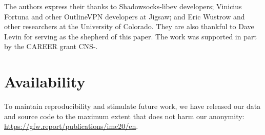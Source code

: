 \documentclass[sigconf,letterpaper]{acmart}
\begin{document}
\begin{acks}
The authors express their thanks to
Shadowsocks-libev developers;
Vinicius Fortuna and other OutlineVPN developers at Jigsaw;
and Eric Wustrow and other researchers at the University of Colorado.
They are also thankful to Dave Levin for serving as the shepherd of this paper.
The work was supported in part by the
 CAREER grant
CNS-.
\end{acks}

\section*{Availability}
To maintain reproducibility and stimulate future work,
we have released our data and source code
to the maximum extent that does not harm our anonymity:
\url{https://gfw.report/publications/imc20/en}.



\balance



\appendix



\end{document}
